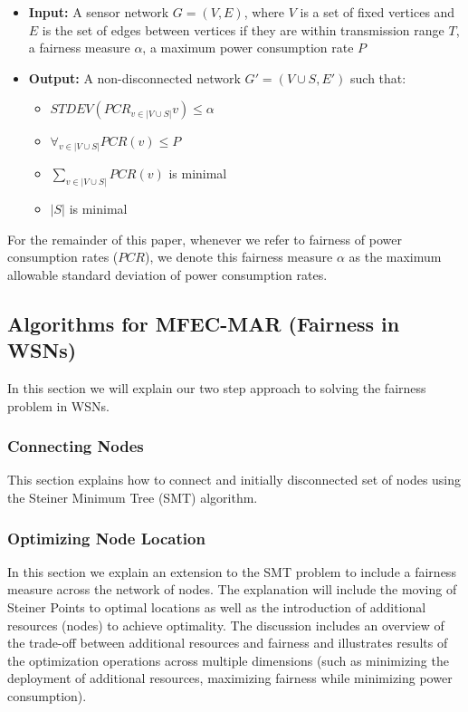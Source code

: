 \begin{itemize}
 \item \textbf{Input:} A sensor network $G = (V, E)$, where $V$ is a set of fixed vertices and $E$ is the set of edges between vertices if they are within transmission range $T$, a fairness measure $\alpha$, a maximum power consumption rate $P$

\item \textbf{Output:} A non-disconnected network $G' = (V \cup S, E')$ such that:
	\begin{itemize}
		\item $STDEV( PCR_{v \in |V \cup S|} v) \leq \alpha$
		\item $\forall_{v \in |V \cup S|} PCR(v) \leq P$
		\item $\sum_{v \in |V \cup S|} PCR(v)$ is minimal
		\item $|S|$ is minimal
	\end{itemize}
\end{itemize}

For the remainder of this paper, whenever we refer to fairness of power consumption rates ($PCR$), we denote this fairness measure $\alpha$ as the maximum allowable standard deviation of power consumption rates.


\subsection{Algorithms for MFEC-MAR (Fairness in WSNs)}
In this section we will explain our two step approach to solving the fairness problem in WSNs.

\subsubsection{Connecting Nodes}
This section explains how to connect and initially disconnected set of nodes using the Steiner Minimum Tree (SMT) algorithm.
\subsubsection{Optimizing Node Location}
In this section we explain an extension to the SMT problem to include a fairness measure across the network of nodes.
The explanation will include the moving of Steiner Points to optimal locations as well as the introduction of additional resources (nodes) to achieve optimality. The discussion includes an overview of the trade-off between additional resources and  fairness and illustrates results of the optimization operations across multiple dimensions (such as minimizing the deployment of additional resources, maximizing fairness while minimizing power consumption).